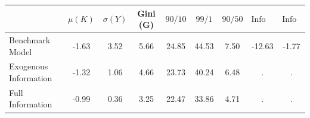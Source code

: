 \def\sym#1{\ifmmode^{#1}\else\(^{#1}\)\fi}

\begin{tabular*}{\textwidth}{@{\extracolsep{\fill}} lcccccccc }
\toprule
\toprule
& $\mu(K)$ & $\sigma(Y) $ & Gini (G)  & $ 90/10 $ & $99/1$ & $90/50$ & $\text{Info U.}$ & $\text{Info E.}$\\
\midrule
Benchmark Model & -1.63 & 3.52 & 5.66 & 24.85 & 44.53 & 7.50 & -12.63 & -1.77\\ 
[1em] Exogenous Information & -1.32 & 1.06 & 4.66 & 23.73 & 40.24 & 6.48 & . & . \\ 
[1em] Full  Information & -0.99 & 0.36 & 3.25 & 22.47 & 33.86 & 4.71 & . & .\\ 
\bottomrule
\bottomrule
\end{tabular*}
